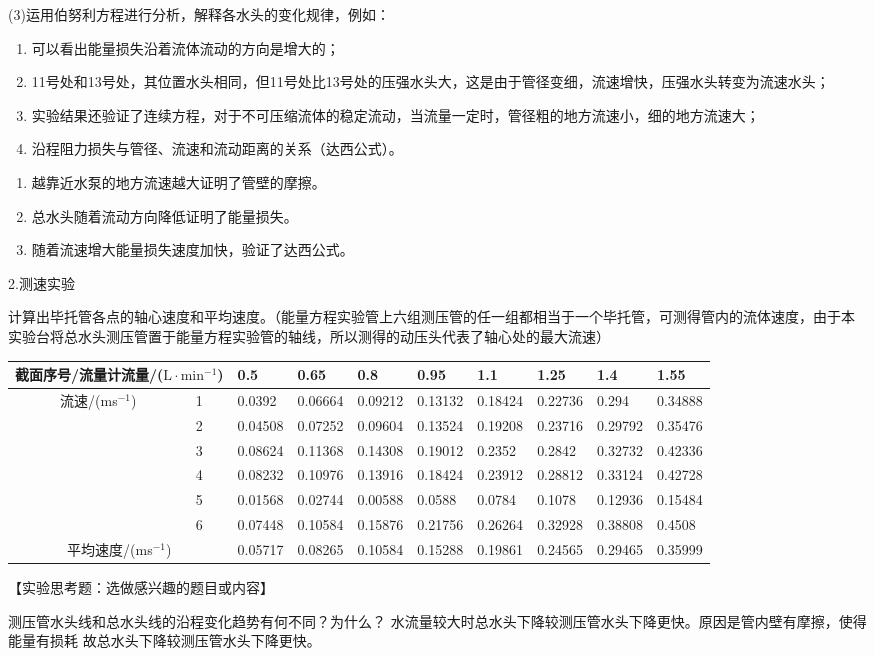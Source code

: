 \documentclass[dvipsnames, svgnames,a4paper,11pt]{article}
\begin{document}
\newpage
(3)运用伯努利方程进行分析，解释各水头的变化规律，例如：
\begin{enumerate}
	\item 可以看出能量损失沿着流体流动的方向是增大的；
	\item 11号处和13号处，其位置水头相同，但11号处比13号处的压强水头大，这是由于管径变细，流速增快，压强水头转变为流速水头；
	\item 实验结果还验证了连续方程，对于不可压缩流体的稳定流动，当流量一定时，管径粗的地方流速小，细的地方流速大；
	\item 沿程阻力损失与管径、流速和流动距离的关系（达西公式）。
\end{enumerate}
\begin{enumerate}
	\item 越靠近水泵的地方流速越大证明了管壁的摩擦。
	\item 总水头随着流动方向降低证明了能量损失。
	\item 随着流速增大能量损失速度加快，验证了达西公式。
\end{enumerate}
\par
2.测速实验\par
计算出毕托管各点的轴心速度和平均速度。（能量方程实验管上六组测压管的任一组都相当于一个毕托管，可测得管内的流体速度，由于本实验台将总水头测压管置于能量方程实验管的轴线，所以测得的动压头代表了轴心处的最大流速）
\begin{table}[!h]
	\renewcommand\arraystretch{1.7}
	\centering
	\begin{tabularx}{\textwidth}{|c|X|X|X|X|X|X|X|X|X|}
	\hline
	\multicolumn{2}{|c|}{截面序号/流量计流量/($\text{L}\cdot\text{min}^{-1}$)} & 0.5 & 0.65 & 0.8 & 0.95 & 1.1 & 1.25 & 1.4 & 1.55 \\ \hline
	\multirow{6}{*}{流速/(ms$^{-1}$)}&1 & 0.0392 & 0.06664 & 0.09212 & 0.13132 & 0.18424 & 0.22736 & 0.294 & 0.34888 \\ \cline{2-10}
	&2 & 0.04508 & 0.07252 & 0.09604 & 0.13524 & 0.19208 & 0.23716 & 0.29792 & 0.35476 \\ \cline{2-10}
	&3 & 0.08624 & 0.11368 & 0.14308 & 0.19012 & 0.2352 & 0.2842 & 0.32732 & 0.42336 \\ \cline{2-10}
	&4 & 0.08232 & 0.10976 & 0.13916 & 0.18424 & 0.23912 & 0.28812 & 0.33124 & 0.42728 \\ \cline{2-10}
	&5 & 0.01568 & 0.02744 & 0.00588 & 0.0588 & 0.0784 & 0.1078 & 0.12936 & 0.15484 \\ \cline{2-10}
	&6 & 0.07448 & 0.10584 & 0.15876 & 0.21756 & 0.26264 & 0.32928 & 0.38808 & 0.4508 \\ \hline
	\multicolumn{2}{|c|}{平均速度/(ms$^{-1}$)} &0.05717	&0.08265& 0.10584&0.15288&0.19861&0.24565&0.29465&0.35999\\
	\hline
	\end{tabularx}
\end{table}\par
\newpage
【实验思考题：选做感兴趣的题目或内容】\\
\begin{question}
	测压管水头线和总水头线的沿程变化趋势有何不同？为什么？
	\tcblower
	水流量较大时总水头下降较测压管水头下降更快。原因是管内壁有摩擦，使得能量有损耗
	故总水头下降较测压管水头下降更快。
\end{question}
\end{document}
